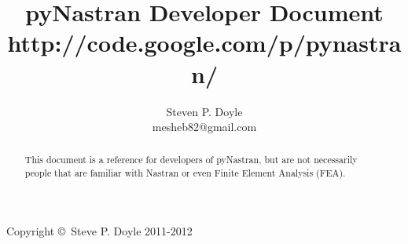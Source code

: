 \documentclass[a4paper,12pt]{article}
\begin{document}
\title{pyNastran Developer Document \\
\small http://code.google.com/p/pynastran/ }
\author{Steven P. Doyle\\
{\small mesheb82@gmail.com}
}

\maketitle

\begin{abstract}
This document is a reference for developers of pyNastran, but are not
necessarily people that are familiar with Nastran or even Finite Element
Analysis (FEA).
\end{abstract}

Copyright \copyright\ Steve P. Doyle 2011-2012
\newpage

\tableofcontents
\newpage


\newpage

%





%
%
%
%

%
%
\end{document}
